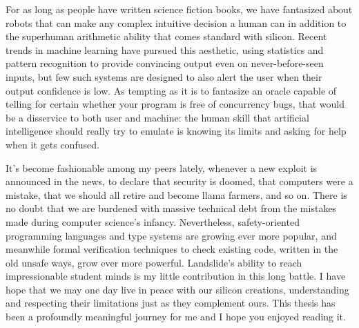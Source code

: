 \documentclass[12pt]{cmuthesis}
\begin{document}
For as long as people have written science fiction books,
we have fantasized about robots that can make any complex intuitive decision a human can
in addition to the superhuman arithmetic ability that comes standard with silicon.
Recent trends in machine learning have pursued this aesthetic,
using statistics and pattern recognition to provide convincing output even on never-before-seen inputs,
but few such systems are designed to also alert the user when their output confidence is low.
As tempting as it is to fantasize an oracle capable of telling for certain whether your program is free of concurrency bugs,
that would be a disservice to both user and machine:
the human skill that artificial intelligence should really try to emulate is
knowing its limits and asking for help when it gets confused.

It's become fashionable among my peers lately,
whenever a new exploit is announced in the news,
to declare that security is doomed,
that computers were a mistake,
that we should all retire and become llama farmers,
and so on.
There is no doubt that we are burdened with massive technical debt from the mistakes made
during computer science's infancy.
Nevertheless,
safety-oriented programming languages and type systems are growing ever more popular,
and meanwhile formal verification techniques to check existing code,
written in the old unsafe ways, grow ever more powerful.
Landslide's ability to reach impressionable student minds is my little contribution in this long battle.
I have hope that we may one day live in peace with our silicon creations,
understanding and respecting their limitations just as they complement ours.
This thesis has been a profoundly meaningful journey for me and I hope you enjoyed reading it.
\end{document}
